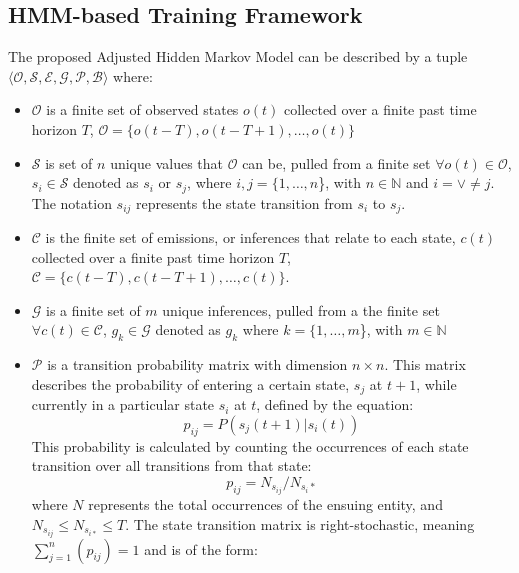 \documentclass[conference]{IEEEtran}
\newcommand\NB[1]{$\spadesuit$\footnote{NB: #1}}
\begin{document}

\subsection{HMM-based Training Framework} \label{sec:fmwk}

The proposed Adjusted Hidden Markov Model can be described by a tuple $\langle \mathcal{O},\mathcal{S},\mathcal{E},\mathcal{G},\mathcal{P},\mathcal{B} \rangle$  where:
\begin{itemize}
    \item $\mathcal{O}$ is a finite set of observed states $o(t)$ collected over a finite past time horizon $T$, $\mathcal{O} = \{ o(t-T), o(t-T+1), \ldots, o(t)\}$
    \item  $\mathcal{S}$ is set of $n$ unique values that $\mathcal{O}$ can be, pulled from a finite set $\forall o(t)\in\mathcal{O}$, $s_i \in \mathcal{S}$ denoted as $s_{i}$ or $s_{j}$, where $i,j = \{1,\ldots,n$\}, with $n \in \mathbb{N}$ and $i = \lor \neq j$. The notation $s_{ij}$ represents the state transition from $s_i$ to $s_j$.
    \item $\mathcal{C}$ is the finite set of emissions, or inferences that relate to each state, $c(t)$ collected over a finite past time horizon $T$, $\mathcal{C} = \{ c(t-T), c(t-T+1), \ldots, c(t)\}$.  
    \item $\mathcal{G}$ is a finite set of $m$ unique inferences, pulled from a the finite set $\forall c(t)\in\mathcal{C}$, $g_k \in \mathcal{G}$ denoted as $g_{k}$ where $k = \{1,\ldots,m$\}, with $m \in \mathbb{N}$
    \item $\mathcal{P}$ is a transition probability matrix with dimension $n \times n$. This matrix describes the probability of entering a certain state, $s_{j}$ at $t+1$, while currently in a particular state $s_{i}$ at $t$, defined by the equation:
        \begin{equation}
            p_{ij} = P(s_j(t+1) \vert s_i(t))
        \end{equation}
        This probability is calculated by counting the occurrences of each state transition over all transitions from that state:
        \begin{equation} \label{eq:transbuild}
            p_{ij} = N_{s_{ij}}/N_{s_{i}*}
        \end{equation}
        where $N$ represents the total occurrences of the ensuing entity, and $N_{s_{ij}} \leq N_{s_{i*}} \leq T$. The state transition matrix is right-stochastic, meaning $\sum_{j=1}^{n}(p_{ij}) = 1$ and is of the form:

\end{itemize}
\end{document}
